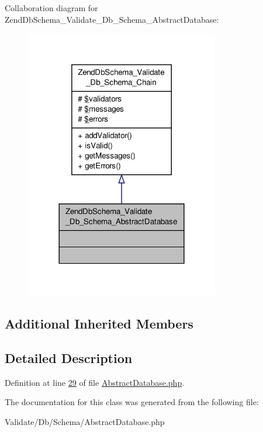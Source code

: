 Collaboration diagram for Zend\-Db\-Schema\-\_\-\-Validate\-\_\-\-Db\-\_\-\-Schema\-\_\-\-Abstract\-Database\-:\nopagebreak
\begin{figure}[H]
\begin{center}
\leavevmode
\includegraphics[width=240pt]{classZendDbSchema__Validate__Db__Schema__AbstractDatabase__coll__graph}
\end{center}
\end{figure}
\subsection*{Additional Inherited Members}


\subsection{Detailed Description}


Definition at line \hyperlink{AbstractDatabase_8php_source_l00029}{29} of file \hyperlink{AbstractDatabase_8php_source}{Abstract\-Database.\-php}.



The documentation for this class was generated from the following file\-:\begin{DoxyCompactItemize}
\item 
Validate/\-Db/\-Schema/Abstract\-Database.\-php\end{DoxyCompactItemize}
